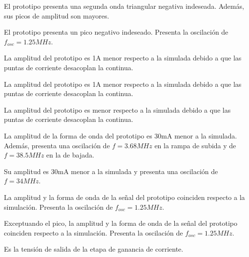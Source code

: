 
El prototipo presenta una segunda onda triangular negativa indeseada. 
Además, sus picos de amplitud son mayores. 


El prototipo presenta un pico negativo indeseado. 
Presenta la oscilación de $f_{osc}=1.25MHz$. 


La amplitud del prototipo es 1A menor respecto a la simulada debido a que las puntas de corriente desacoplan la continua. 


La amplitud del prototipo es 1A menor respecto a la simulada debido a que las puntas de corriente desacoplan la continua. 


La amplitud del prototipo es menor respecto a la simulada debido a que las puntas de corriente desacoplan la continua. 


La amplitud de la forma de onda del prototipo es 30mA menor a la simulada. 
Además, presenta una oscilación de $f=3.68MHz$ en la rampa de subida y de $f=38.5MHz$ en la de bajada. 


Su amplitud es 30mA menor a la simulada y presenta una oscilación de $f=34MHz$.


La amplitud y la forma de onda de la señal del prototipo coinciden respecto a la simulación.
Presenta la oscilación de $f_{osc}=1.25MHz$. 


Exceptuando el pico, la amplitud y la forma de onda de la señal del prototipo coinciden respecto a la simulación.
Presenta la oscilación de $f_{osc}=1.25MHz$. 


Es la tensión de salida de la etapa de ganancia de corriente.

